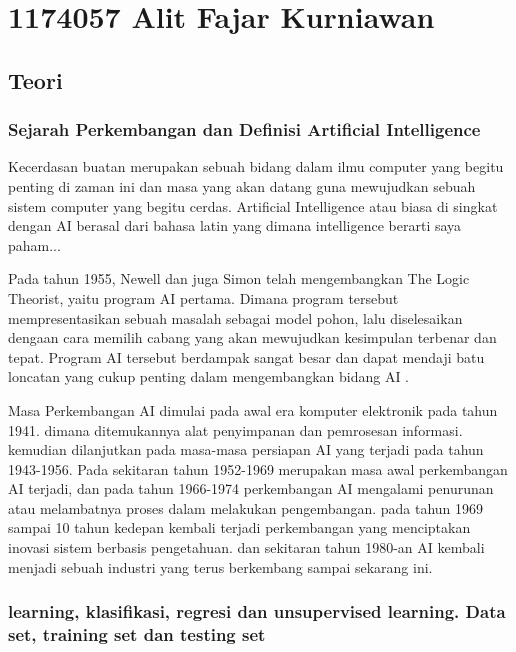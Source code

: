 \section{1174057 Alit Fajar Kurniawan}
\subsection{Teori}
	\subsubsection {Sejarah Perkembangan dan Definisi Artiﬁcial Intelligence}
	Kecerdasan buatan merupakan sebuah bidang dalam ilmu computer yang begitu penting di zaman ini dan masa yang akan datang guna mewujudkan sebuah sistem computer yang begitu cerdas. Artiﬁcial Intelligence atau biasa di singkat dengan AI berasal dari bahasa latin yang dimana intelligence berarti saya paham... 
	\par Pada tahun 1955, Newell dan juga Simon telah mengembangkan The Logic Theorist, yaitu program AI pertama. Dimana program tersebut mempresentasikan sebuah masalah sebagai model pohon, lalu diselesaikan dengaan cara memilih cabang yang akan mewujudkan kesimpulan terbenar dan tepat. Program AI tersebut berdampak sangat besar dan dapat mendaji batu loncatan yang cukup penting dalam mengembangkan bidang AI \cite{baraja2008kecerdasan}.
	\par
	Masa Perkembangan AI dimulai pada awal era komputer elektronik pada tahun 1941. dimana ditemukannya alat penyimpanan dan pemrosesan informasi. kemudian dilanjutkan pada masa-masa persiapan AI yang terjadi pada tahun 1943-1956. Pada sekitaran tahun 1952-1969 merupakan masa awal perkembangan AI terjadi, dan pada tahun 1966-1974 perkembangan AI mengalami penurunan atau melambatnya proses dalam melakukan pengembangan. pada tahun 1969 sampai 10 tahun kedepan kembali terjadi perkembangan yang menciptakan inovasi sistem berbasis pengetahuan. dan sekitaran tahun 1980-an AI kembali menjadi sebuah industri yang terus berkembang sampai sekarang ini.


	\subsubsection{learning, klasiﬁkasi, regresi dan unsupervised learning. Data set, training set dan testing set}

